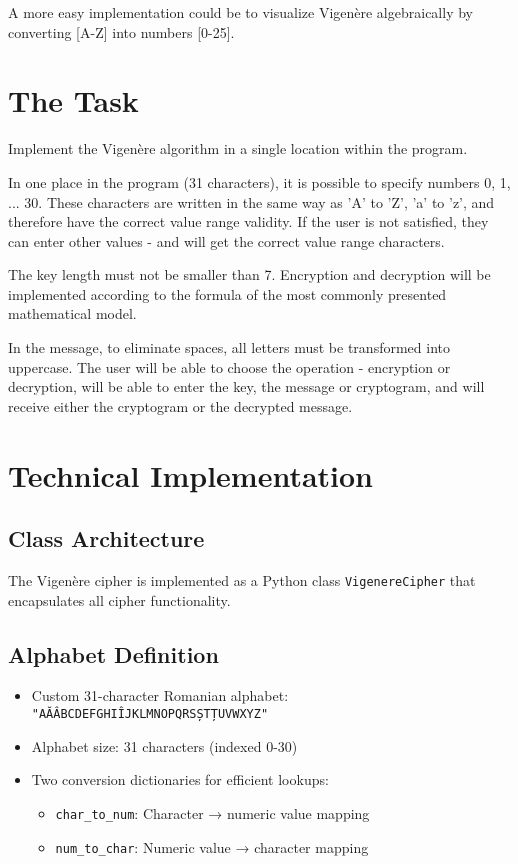 \documentclass[12pt]{article}
\begin{document}
A more easy implementation could be to visualize Vigenère algebraically by converting [A-Z] into numbers [0-25].


\section*{The Task}

Implement the Vigenère algorithm in a single location within the program.

In one place in the program (31 characters), it is possible to specify numbers 0, 1, ... 30. These characters are written in the same way as 'A' to 'Z', 'a' to 'z', and therefore have the correct value range validity. If the user is not satisfied, they can enter other values - and will get the correct value range characters.

The key length must not be smaller than 7. Encryption and decryption will be implemented according to the formula of the most commonly presented mathematical model.

In the message, to eliminate spaces, all letters must be transformed into uppercase. The user will be able to choose the operation - encryption or decryption, will be able to enter the key, the message or cryptogram, and will receive either the cryptogram or the decrypted message.

\section*{Technical Implementation}

\subsection*{Class Architecture}
The Vigenère cipher is implemented as a Python class \texttt{VigenereCipher} that encapsulates all cipher functionality.

\subsection*{Alphabet Definition}
\begin{itemize}
    \item Custom 31-character Romanian alphabet: \texttt{"AĂÂBCDEFGHIÎJKLMNOPQRSȘTȚUVWXYZ"}
    \item Alphabet size: 31 characters (indexed 0-30)
    \item Two conversion dictionaries for efficient lookups:
    \begin{itemize}
        \item \texttt{char\_to\_num}: Character → numeric value mapping
        \item \texttt{num\_to\_char}: Numeric value → character mapping
    \end{itemize}
\end{itemize}
\end{document}
